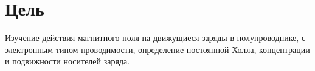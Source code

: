 \section*{Цель}

Изучение действия магнитного поля на движущиеся заряды в полупроводнике, с
электронным типом проводимости, определение постоянной Холла, концентрации и подвижности носителей
заряда. 
